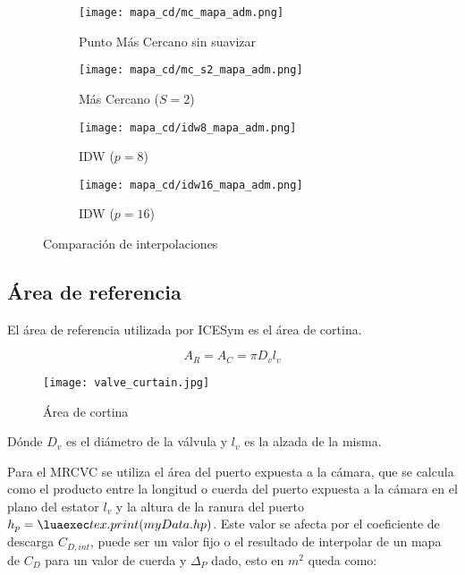 \begin{figure}
    \centering
    \begin{subfigure}{0.4\textwidth}
        \centering
        \texttt{[image: mapa\_cd/mc\_mapa\_adm.png]}
        \caption{Punto Más Cercano sin suavizar}
    \end{subfigure}
    \hfill
    \begin{subfigure}{0.4\textwidth}
        \centering
        \texttt{[image: mapa\_cd/mc\_s2\_mapa\_adm.png]}
        \caption{Más Cercano ($S=2$)}
    \end{subfigure}
    \hfill
    \begin{subfigure}{0.4\textwidth}
        \centering
        \texttt{[image: mapa\_cd/idw8\_mapa\_adm.png]}
        \caption{IDW ($p=8$)}
    \end{subfigure}
    \hfill
    \begin{subfigure}{0.4\textwidth}
        \centering
        \texttt{[image: mapa\_cd/idw16\_mapa\_adm.png]}
        \caption{IDW ($p=16$)}
    \end{subfigure}
    \caption{Comparación de interpolaciones}\label{fig:mapas_interpolados}
\end{figure}


\subsection{Área de referencia}
%
El área de referencia utilizada por ICESym es el área de cortina.

\begin{equation}
  \label{eq:Ar}
  A_R = A_C = \pi D_v l_v
\end{equation}

\begin{figure}
  \centering
  \texttt{[image: valve\_curtain.jpg]}
  \caption{Área de cortina}\label{fig:area_cortina}
\end{figure}

Dónde $D_v$ es el diámetro de la válvula y $l_v$ es la alzada de la misma.

Para el MRCVC se utiliza el área del puerto expuesta a la cámara, que se
calcula como el producto entre la longitud o cuerda del puerto expuesta a la
cámara en el plano del estator $l_v$ y la altura de la ranura del puerto
$h_p=\lua{tex.print(myData.hp)}$.
%
Este valor se afecta por el coeficiente de descarga $C_{D,int}$, puede
ser un valor fijo o el resultado de interpolar de un mapa de $C_D$ para
un valor de cuerda y $\Delta_P$ dado, esto en $m^2$ queda como:

